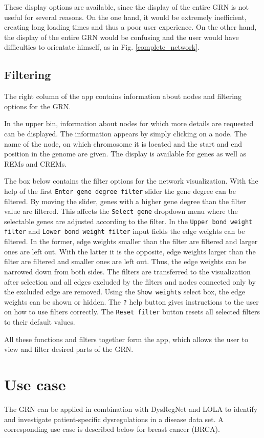 \documentclass[pdftex,12pt,a4paper]{report}
\begin{document}
These display options are available, since the display of the entire GRN is not useful for several reasons. On the one hand, it would be extremely inefficient, creating long loading times and thus a poor user experience. On the other hand, the display of the entire GRN would be confusing and the user would have difficulties to orientate himself, as in Fig. \ref{complete_network}. 

\subsection{Filtering}
The right column of the app contains information about nodes and filtering options for the GRN. 

In the upper bin, information about nodes for which more details are requested can be displayed. The information appears by simply clicking on a node. The name of the node, on which chromosome it is located and the start and end position in the genome are given. The display is available for genes as well as REMs and CREMs. 

The box below contains the filter options for the network visualization. With the help of the first \texttt{Enter gene degree filter} slider the gene degree can be filtered. By moving the slider, genes with a higher gene degree than the filter value are filtered. This affects the \texttt{Select gene} dropdown menu where the selectable genes are adjusted according to the filter. In the \texttt{Upper bond weight filter} and \texttt{Lower bond weight filter} input fields the edge weights can be filtered. In the former, edge weights smaller than the filter are filtered and larger ones are left out. With the latter it is the opposite, edge weights larger than the filter are filtered and smaller ones are left out. Thus, the edge weights can be narrowed down from both sides. The filters are transferred to the visualization after selection and all edges excluded by the filters and nodes connected only by the excluded edge are removed. Using the \texttt{Show weights} select box, the edge weights can be shown or hidden. The \texttt{?} help button gives instructions to the user on how to use filters correctly. The \texttt{Reset filter} button resets all selected filters to their default values. 

All these functions and filters together form the app, which allows the user to view and filter desired parts of the GRN.  

\section{Use case}
The GRN can be applied in combination with DysRegNet and LOLA to identify and investigate patient-specific dysregulations in a disease data set. A corresponding use case is described below for breast cancer (BRCA).
\end{document}
